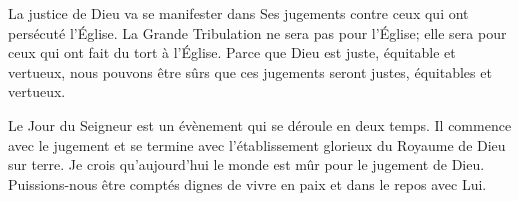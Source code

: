 
La justice de Dieu va se manifester dans Ses jugements contre ceux
 qui ont persécuté l'Église. La Grande Tribulation ne sera pas pour l'Église;
 elle sera pour ceux qui ont fait du tort à l'Église.
 Parce que Dieu est juste, équitable et vertueux, nous pouvons être sûrs
 que ces jugements seront justes, équitables et vertueux.

Le Jour du Seigneur est un évènement qui se déroule en
 deux temps. Il commence avec le jugement et se termine avec l'établissement
 glorieux du Royaume de Dieu sur terre. Je crois qu'aujourd'hui le monde
 est mûr pour le jugement de Dieu. Puissions-nous être comptés dignes de vivre
 en paix et dans le repos avec Lui.

\dvrule




